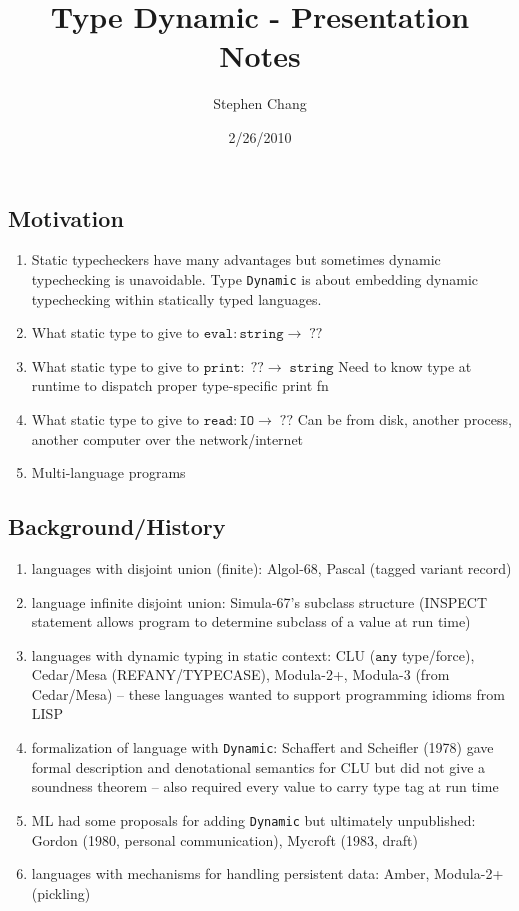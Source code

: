\documentclass[12pt]{article}	%
\begin{document}
\newcommand{\Dynamic}{\texttt{Dynamic}\xspace}
\newcommand{\typecase}{\texttt{typecase}\xspace}
\newcommand{\dynamic}{\texttt{dynamic}\xspace}
\newcommand{\wrong}{\texttt{wrong}\xspace}
\newcommand{\deno}[1]{ \ensuremath{[\![#1]\!]} }
\newcommand{\code}[1]{$\mathtt{#1}$}
\newcommand{\pair}[2]{ \ensuremath{\left\langle #1,#2 \right\rangle} }


\title{Type Dynamic - Presentation Notes}
\author{Stephen Chang}
\date{2/26/2010}
\maketitle

\subsection*{Motivation}
\begin{enumerate}
	\item Static typecheckers have many advantages but sometimes dynamic typechecking is unavoidable. Type \Dynamic is about embedding dynamic typechecking within statically typed languages.
	\item What static type to give to \code{eval:string\rightarrow\;??}
	\item What static type to give to \code{print:\;??\rightarrow\;string}
	      Need to know type at runtime to dispatch proper type-specific print fn
	\item What static type to give to \code{read:IO\rightarrow\;??}
	      Can be from disk, another process, another computer over the network/internet
	\item Multi-language programs
\end{enumerate}

\subsection*{Background/History}
\begin{enumerate}
	\item languages with disjoint union (finite): Algol-68, Pascal (tagged variant record)
	\item language infinite disjoint union: Simula-67's subclass structure (INSPECT statement allows program to determine subclass of a value at run time)
	\item languages with dynamic typing in static context: CLU (\code{any} type/force), Cedar/Mesa (REFANY/TYPECASE), Modula-2+, Modula-3 (from Cedar/Mesa) -- these languages wanted to support programming idioms from LISP
	\item formalization of language with \Dynamic: Schaffert and Scheifler (1978) gave formal description and denotational semantics for CLU but did not give a soundness theorem -- also required every value to carry type tag at run time
	\item ML had some proposals for adding \Dynamic but ultimately unpublished: Gordon (1980, personal communication), Mycroft (1983, draft)
	\item languages with mechanisms for handling persistent data: Amber, Modula-2+ (pickling)
\end{enumerate}
\end{document}
